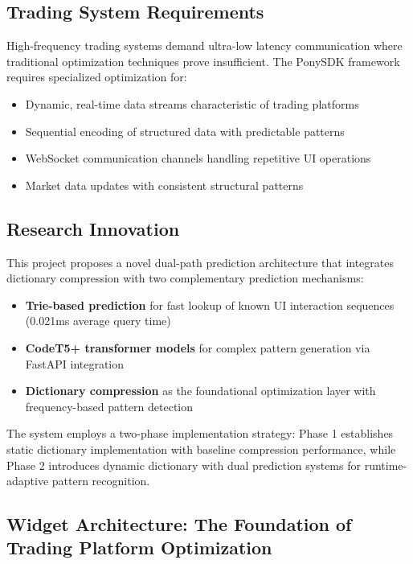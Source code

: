 \documentclass[12pt,a4paper]{article}
\begin{document}
\subsection{Trading System Requirements}

High-frequency trading systems demand ultra-low latency communication where traditional optimization techniques prove insufficient. The PonySDK framework requires specialized optimization for:

\begin{itemize}
    \item Dynamic, real-time data streams characteristic of trading platforms
    \item Sequential encoding of structured data with predictable patterns
    \item WebSocket communication channels handling repetitive UI operations
    \item Market data updates with consistent structural patterns
\end{itemize}

\subsection{Research Innovation}

This project proposes a novel dual-path prediction architecture that integrates dictionary compression with two complementary prediction mechanisms:

\begin{itemize}
    \item \textbf{Trie-based prediction} for fast lookup of known UI interaction sequences (0.021ms average query time)
    \item \textbf{CodeT5+ transformer models} for complex pattern generation via FastAPI integration
    \item \textbf{Dictionary compression} as the foundational optimization layer with frequency-based pattern detection
\end{itemize}

The system employs a two-phase implementation strategy: Phase 1 establishes static dictionary implementation with baseline compression performance, while Phase 2 introduces dynamic dictionary with dual prediction systems for runtime-adaptive pattern recognition.

\subsection{Widget Architecture: The Foundation of Trading Platform Optimization}
\end{document}
